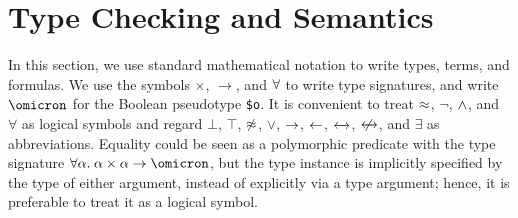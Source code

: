 \section{Type Checking and Semantics} \label{sec_semantics}

 In this section, we use standard
mathematical notation to write types, terms, and formulas.
%
%
We use the symbols ${\times}$, ${\to}$, and ${\forall}$
to write type signatures, and write $\omicron$ %
for the
Boolean pseudotype {\tt \$o}. It is convenient to treat
$\approx$, $\lnot$, $\mathrel{\land}$, and $\forall$ as logical symbols and regard
$\bot$, $\top$, $\not\approx$, $\lor$, $\rightarrow$, $\leftarrow$, $\leftarrow\kern-1.75ex\rightarrow$, $\kern.4875ex\not\kern-.4875ex\leftarrow\kern-1.75ex\rightarrow$, and
$\exists$ as abbreviations.
%
Equality could be seen as a polymorphic predicate with the type signature
$\forall\alpha.\mskip4.5mu \alpha\times\alpha\to\omicron$, but the type instance is
implicitly specified by the type of either argument, instead of explicitly via a
type argument; hence, it is preferable to treat it as a logical symbol.



